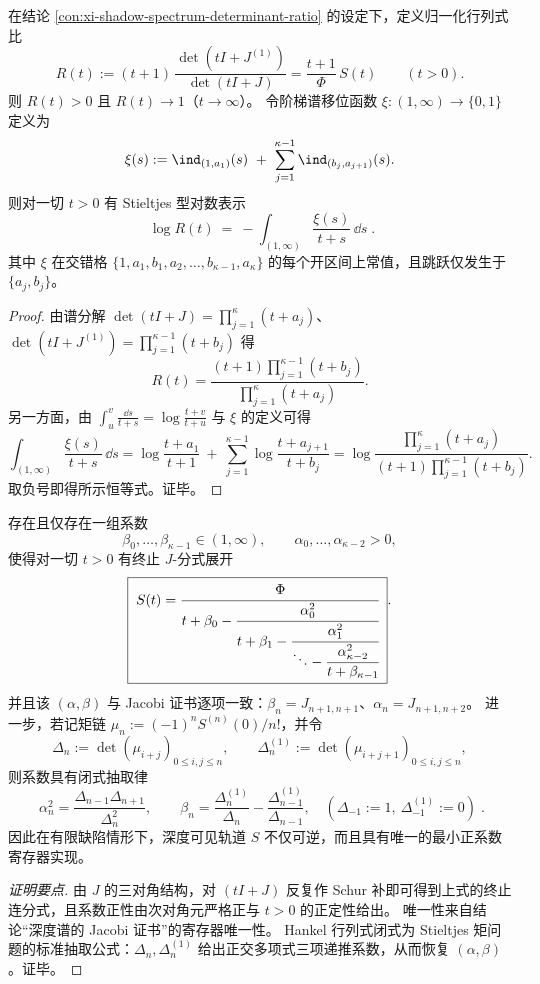 \begin{proposition}\label{prop:xi-krein-spectral-shift-staircase-shadow}
在结论 \ref{con:xi-shadow-spectrum-determinant-ratio} 的设定下，定义归一化行列式比
\[
R(t):=(t+1)\,\frac{\det(tI+J^{(1)})}{\det(tI+J)}
=\frac{t+1}{\Phi}\,S(t)\qquad (t>0).
\]
则 \(R(t)>0\) 且 \(R(t)\to 1\)（\(t\to\infty\)）。
令阶梯谱移位函数 \(\xi:(1,\infty)\to\{0,1\}\) 定义为
\[
\xi(s):=\ind_{(1,a_1)}(s)\ +\ \sum_{j=1}^{\kappa-1}\ind_{(b_j,a_{j+1})}(s).
\]
则对一切 \(t>0\) 有 Stieltjes 型对数表示
\[
\boxed{\;
\log R(t)\ =\ -\int_{(1,\infty)}\frac{\xi(s)}{t+s}\,\dd s\; }.
\]
其中 \(\xi\) 在交错格 \(\{1,a_1,b_1,a_2,\dots,b_{\kappa-1},a_\kappa\}\) 的每个开区间上常值，且跳跃仅发生于 \(\{a_j,b_j\}\)。
\end{proposition}
\begin{proof}
由谱分解
\(
\det(tI+J)=\prod_{j=1}^{\kappa}(t+a_j)
\)、
\(
\det(tI+J^{(1)})=\prod_{j=1}^{\kappa-1}(t+b_j)
\)
得
\[
R(t)=\frac{(t+1)\prod_{j=1}^{\kappa-1}(t+b_j)}{\prod_{j=1}^{\kappa}(t+a_j)}.
\]
另一方面，由
\(
\int_{u}^{v}\frac{\dd s}{t+s}=\log\frac{t+v}{t+u}
\)
与 \(\xi\) 的定义可得
\[
\int_{(1,\infty)}\frac{\xi(s)}{t+s}\,\dd s
=\log\frac{t+a_1}{t+1}
\ +\ \sum_{j=1}^{\kappa-1}\log\frac{t+a_{j+1}}{t+b_j}
=\log\frac{\prod_{j=1}^{\kappa}(t+a_j)}{(t+1)\prod_{j=1}^{\kappa-1}(t+b_j)}.
\]
取负号即得所示恒等式。证毕。
\end{proof}

\begin{proposition}\label{con:xi-terminating-jfraction-uniqueness}
存在且仅存在一组系数
\[
\beta_0,\dots,\beta_{\kappa-1}\in(1,\infty),
\qquad
\alpha_0,\dots,\alpha_{\kappa-2}>0,
\]
使得对一切 \(t>0\) 有终止 \texorpdfstring{$J$}{J}-分式展开
\[
\boxed{\;
S(t)
=\cfrac{\Phi}{t+\beta_0-\cfrac{\alpha_0^2}{t+\beta_1-\cfrac{\alpha_1^2}{\ddots-\cfrac{\alpha_{\kappa-2}^2}{t+\beta_{\kappa-1}}}}}\; }.
\]
并且该 \((\alpha,\beta)\) 与 Jacobi 证书逐项一致：\(\beta_n=J_{n+1,n+1}\)、\(\alpha_n=J_{n+1,n+2}\)。
进一步，若记矩链 \(\mu_n:=(-1)^n S^{(n)}(0)/n!\)，并令
\[
\Delta_n:=\det(\mu_{i+j})_{0\le i,j\le n},
\qquad
\Delta_n^{(1)}:=\det(\mu_{i+j+1})_{0\le i,j\le n},
\]
则系数具有闭式抽取律
\[
\boxed{\;
\alpha_n^2=\frac{\Delta_{n-1}\Delta_{n+1}}{\Delta_n^2},
\qquad
\beta_n=\frac{\Delta_n^{(1)}}{\Delta_n}-\frac{\Delta_{n-1}^{(1)}}{\Delta_{n-1}},
\quad
(\Delta_{-1}:=1,\ \Delta_{-1}^{(1)}:=0)\; }.
\]
因此在有限缺陷情形下，深度可见轨道 \(S\) 不仅可逆，而且具有唯一的最小正系数寄存器实现。
\end{proposition}
\begin{proof}[证明要点]
由 \(J\) 的三对角结构，对 \((tI+J)\) 反复作 Schur 补即可得到上式的终止连分式，且系数正性由次对角元严格正与 \(t>0\) 的正定性给出。
唯一性来自结论“深度谱的 Jacobi 证书”的寄存器唯一性。
Hankel 行列式闭式为 Stieltjes 矩问题的标准抽取公式：\(\Delta_n,\Delta_n^{(1)}\) 给出正交多项式三项递推系数，从而恢复 \((\alpha,\beta)\)。证毕。
\end{proof}

